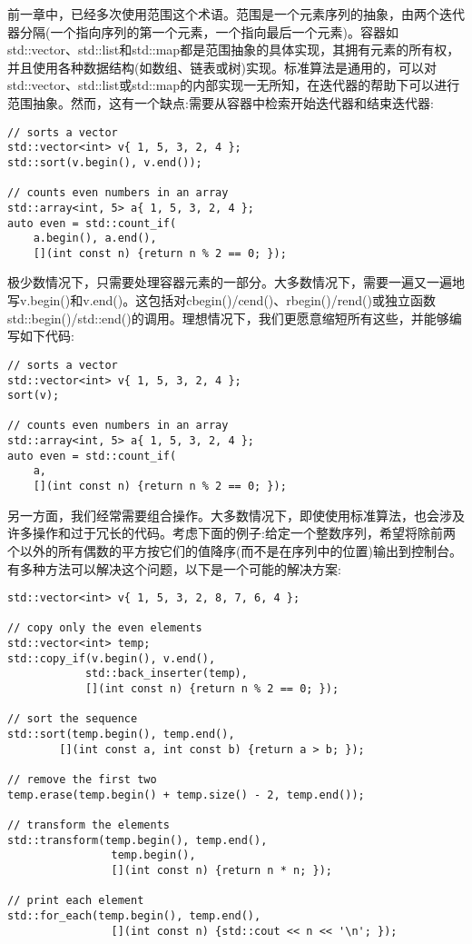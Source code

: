 前一章中，已经多次使用范围这个术语。范围是一个元素序列的抽象，由两个迭代器分隔(一个指向序列的第一个元素，一个指向最后一个元素)。容器如std::vector、std::list和std::map都是范围抽象的具体实现，其拥有元素的所有权，并且使用各种数据结构(如数组、链表或树)实现。标准算法是通用的，可以对std::vector、std::list或std::map的内部实现一无所知，在迭代器的帮助下可以进行范围抽象。然而，这有一个缺点:需要从容器中检索开始迭代器和结束迭代器:

\begin{lstlisting}[style=styleCXX]
// sorts a vector
std::vector<int> v{ 1, 5, 3, 2, 4 };
std::sort(v.begin(), v.end());

// counts even numbers in an array
std::array<int, 5> a{ 1, 5, 3, 2, 4 };
auto even = std::count_if(
	a.begin(), a.end(),
	[](int const n) {return n % 2 == 0; });
\end{lstlisting}

极少数情况下，只需要处理容器元素的一部分。大多数情况下，需要一遍又一遍地写v.begin()和v.end()。这包括对cbegin()/cend()、rbegin()/rend()或独立函数std::begin()/std::end()的调用。理想情况下，我们更愿意缩短所有这些，并能够编写如下代码:

\begin{lstlisting}[style=styleCXX]
// sorts a vector
std::vector<int> v{ 1, 5, 3, 2, 4 };
sort(v);

// counts even numbers in an array
std::array<int, 5> a{ 1, 5, 3, 2, 4 };
auto even = std::count_if(
	a,
	[](int const n) {return n % 2 == 0; });
\end{lstlisting}

另一方面，我们经常需要组合操作。大多数情况下，即使使用标准算法，也会涉及许多操作和过于冗长的代码。考虑下面的例子:给定一个整数序列，希望将除前两个以外的所有偶数的平方按它们的值降序(而不是在序列中的位置)输出到控制台。有多种方法可以解决这个问题，以下是一个可能的解决方案:

\begin{lstlisting}[style=styleCXX]
std::vector<int> v{ 1, 5, 3, 2, 8, 7, 6, 4 };

// copy only the even elements
std::vector<int> temp;
std::copy_if(v.begin(), v.end(),
			std::back_inserter(temp),
			[](int const n) {return n % 2 == 0; });
			
// sort the sequence
std::sort(temp.begin(), temp.end(),
		[](int const a, int const b) {return a > b; });
		
// remove the first two
temp.erase(temp.begin() + temp.size() - 2, temp.end());

// transform the elements
std::transform(temp.begin(), temp.end(),
				temp.begin(),
				[](int const n) {return n * n; });

// print each element
std::for_each(temp.begin(), temp.end(),
				[](int const n) {std::cout << n << '\n'; });
\end{lstlisting}

